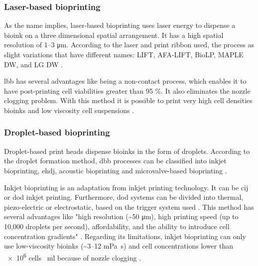 \subsubsection{Laser-based bioprinting}
\label{subsubsec:laser_based_bioprinting}

As the name implies, laser-based bioprinting uses laser energy to dispense a bioink on a three dimensional spatial arrangement. It has a high spatial resolution of \numrange{1}{3} \si{\micro\meter}. According to the laser and print ribbon used, the process as slight variations that have different names: LIFT, AFA-LIFT, BioLP, MAPLE DW, and LG DW \cite{Vijayavenkataraman2018_bioprinting_tissues_organs_regen_med}.

\gls{lbb} has several advantages like being a non-contact process, which enables it to have post-printing cell viabilities greater than 95 \%. It also eliminates the nozzle clogging problem. With this method it is possible to print very high cell densities bioinks and low viscosity cell suspensions \cite{Vijayavenkataraman2018_bioprinting_tissues_organs_regen_med}.


\subsubsection{Droplet-based bioprinting}
\label{subsubsec:droplet_based_bioprinting}

Droplet-based print heads dispense bioinks in the form of droplets. According to the droplet formation method, \gls{dbb} processes can be classified into inkjet bioprinting, \gls{ehdj}, acoustic bioprinting and microvalve-based bioprinting \cite{Vijayavenkataraman2018_bioprinting_tissues_organs_regen_med}.

Inkjet bioprinting is an adaptation from inkjet printing technology. It can be \gls{cij} or \gls{dod} inkjet printing. Furthermore, \gls{dod} systems can be divided into thermal, piezo-electric or electrostatic, based on the trigger system used \cite{Vijayavenkataraman2018_bioprinting_tissues_organs_regen_med}. This method has several advantages like "high resolution (\textasciitilde 50 \si{\micro\meter}), high printing speed (up to 10,000 droplets per second), affordability, and the ability to introduce cell concentration gradients" \cite{Vijayavenkataraman2018_bioprinting_tissues_organs_regen_med}. Regarding its limitations, inkjet bioprinting can only use low-viscosity bioinks (\textasciitilde \numrange{3}{12} \si{\milli\pascal\second}) and cell concentrations lower than \num{e6} cells \si{\per\milli\litre} because of nozzle clogging \cite{Vijayavenkataraman2018_bioprinting_tissues_organs_regen_med}.

